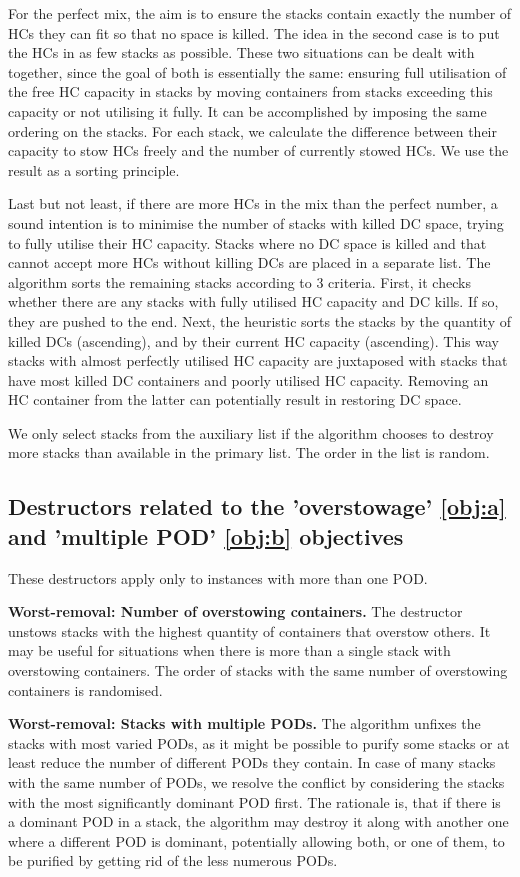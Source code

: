 \documentclass[preprint,11pt,3p]{elsarticle}
\begin{document}
For the perfect mix, the aim is to ensure the stacks contain exactly the number of HCs they can fit so that no space is killed. The idea in the second case is to put the HCs in as few stacks as possible. These two situations can be dealt with together, since the goal of both is essentially the same: ensuring full utilisation of the free HC capacity in stacks by moving containers from stacks exceeding this capacity or not utilising it fully. It can be accomplished by imposing the same ordering on the stacks. For each stack, we calculate the difference between their capacity to stow HCs freely and the number of currently stowed HCs. We use the result as a sorting principle. 

Last but not least, if there are more HCs in the mix than the perfect number, a sound intention is to minimise the number of stacks with killed DC space, trying to fully utilise their HC capacity. Stacks where no DC space is killed and that cannot accept more HCs without killing DCs are placed in a separate list. The algorithm sorts the remaining stacks according to 3 criteria. First, it checks whether there are any stacks with fully utilised HC capacity and DC kills. If so, they are pushed to the end. Next, the heuristic sorts the stacks by the quantity of killed DCs (ascending), and by their current HC capacity (ascending). This way stacks with almost perfectly utilised HC capacity are juxtaposed with stacks that have most killed DC containers and poorly utilised HC capacity. Removing an HC container from the latter can potentially result in restoring DC space. 

We only select stacks from the auxiliary list if the algorithm chooses to destroy more stacks than available in the primary list. The order in the list is random.

\subsection{Destructors related to the 'overstowage' \ref{obj:a} and 'multiple POD' \ref{obj:b} objectives}
These destructors apply only to instances with more than one POD.

\textbf{Worst-removal: Number of overstowing containers.} The destructor unstows stacks with the highest quantity of containers that overstow others. It may be useful for situations when there is more than a single stack with overstowing containers. The order of stacks with the same number of overstowing containers is randomised.

\textbf{Worst-removal: Stacks with multiple PODs.} The algorithm unfixes the stacks with most varied PODs, as it might be possible to purify some stacks or at least reduce the number of different PODs they contain. In case of many stacks with the same number of PODs, we resolve the conflict by considering the stacks with the most significantly dominant POD first. The rationale is, that if there is a dominant POD in a stack, the algorithm may destroy it along with another one where a different POD is dominant, potentially allowing both, or one of them, to be purified by getting rid of the less numerous PODs.
\end{document}
